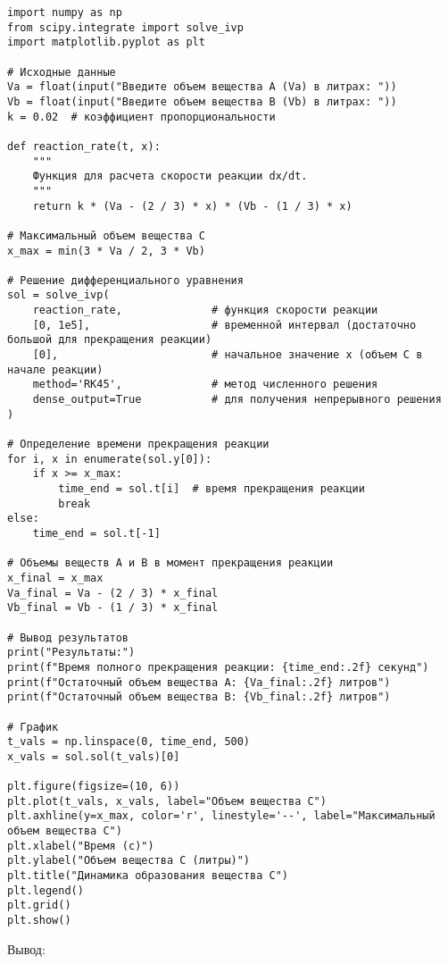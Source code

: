 \begin{verbatim}
import numpy as np
from scipy.integrate import solve_ivp
import matplotlib.pyplot as plt

# Исходные данные
Va = float(input("Введите объем вещества A (Va) в литрах: "))
Vb = float(input("Введите объем вещества B (Vb) в литрах: "))
k = 0.02  # коэффициент пропорциональности

def reaction_rate(t, x):
    """
    Функция для расчета скорости реакции dx/dt.
    """
    return k * (Va - (2 / 3) * x) * (Vb - (1 / 3) * x)

# Максимальный объем вещества C
x_max = min(3 * Va / 2, 3 * Vb)

# Решение дифференциального уравнения
sol = solve_ivp(
    reaction_rate,              # функция скорости реакции
    [0, 1e5],                   # временной интервал (достаточно большой для прекращения реакции)
    [0],                        # начальное значение x (объем C в начале реакции)
    method='RK45',              # метод численного решения
    dense_output=True           # для получения непрерывного решения
)

# Определение времени прекращения реакции
for i, x in enumerate(sol.y[0]):
    if x >= x_max:
        time_end = sol.t[i]  # время прекращения реакции
        break
else:
    time_end = sol.t[-1]

# Объемы веществ A и B в момент прекращения реакции
x_final = x_max
Va_final = Va - (2 / 3) * x_final
Vb_final = Vb - (1 / 3) * x_final

# Вывод результатов
print("Результаты:")
print(f"Время полного прекращения реакции: {time_end:.2f} секунд")
print(f"Остаточный объем вещества A: {Va_final:.2f} литров")
print(f"Остаточный объем вещества B: {Vb_final:.2f} литров")

# График
t_vals = np.linspace(0, time_end, 500)
x_vals = sol.sol(t_vals)[0]

plt.figure(figsize=(10, 6))
plt.plot(t_vals, x_vals, label="Объем вещества C")
plt.axhline(y=x_max, color='r', linestyle='--', label="Максимальный объем вещества C")
plt.xlabel("Время (с)")
plt.ylabel("Объем вещества C (литры)")
plt.title("Динамика образования вещества C")
plt.legend()
plt.grid()
plt.show()
\end{verbatim}

Вывод:

